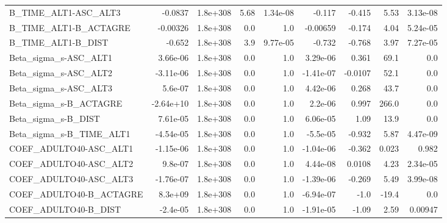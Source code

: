 \begin{tabular}{lrrrrrrrr}
B\_TIME\_ALT1-ASC\_ALT3              &     -0.0837 &     1.8e+308 &    5.68 & 1.34e-08 &     -0.117 &      -0.415 &         5.53 &      3.13e-08 \\
B\_TIME\_ALT1-B\_ACTAGRE             &    -0.00326 &     1.8e+308 &     0.0 &      1.0 &   -0.00659 &      -0.174 &         4.04 &      5.24e-05 \\
B\_TIME\_ALT1-B\_DIST                &      -0.652 &     1.8e+308 &     3.9 & 9.77e-05 &     -0.732 &      -0.768 &         3.97 &      7.27e-05 \\
Beta\_sigma\_s-ASC\_ALT1             &    3.66e-06 &     1.8e+308 &     0.0 &      1.0 &   3.29e-06 &       0.361 &         69.1 &           0.0 \\
Beta\_sigma\_s-ASC\_ALT2             &   -3.11e-06 &     1.8e+308 &     0.0 &      1.0 &  -1.41e-07 &     -0.0107 &         52.1 &           0.0 \\
Beta\_sigma\_s-ASC\_ALT3             &     5.6e-07 &     1.8e+308 &     0.0 &      1.0 &   4.42e-06 &       0.268 &         43.7 &           0.0 \\
Beta\_sigma\_s-B\_ACTAGRE            &   -2.64e+10 &     1.8e+308 &     0.0 &      1.0 &    2.2e-06 &       0.997 &        266.0 &           0.0 \\
Beta\_sigma\_s-B\_DIST               &    7.61e-05 &     1.8e+308 &     0.0 &      1.0 &   6.06e-05 &        1.09 &         13.9 &           0.0 \\
Beta\_sigma\_s-B\_TIME\_ALT1          &   -4.54e-05 &     1.8e+308 &     0.0 &      1.0 &   -5.5e-05 &      -0.932 &         5.87 &      4.47e-09 \\
COEF\_ADULTO40-ASC\_ALT1            &   -1.15e-06 &     1.8e+308 &     0.0 &      1.0 &  -1.04e-06 &      -0.362 &        0.023 &         0.982 \\
COEF\_ADULTO40-ASC\_ALT2            &     9.8e-07 &     1.8e+308 &     0.0 &      1.0 &   4.44e-08 &      0.0108 &         4.23 &      2.34e-05 \\
COEF\_ADULTO40-ASC\_ALT3            &   -1.76e-07 &     1.8e+308 &     0.0 &      1.0 &  -1.39e-06 &      -0.269 &         5.49 &      3.99e-08 \\
COEF\_ADULTO40-B\_ACTAGRE           &     8.3e+09 &     1.8e+308 &     0.0 &      1.0 &  -6.94e-07 &        -1.0 &        -19.4 &           0.0 \\
COEF\_ADULTO40-B\_DIST              &    -2.4e-05 &     1.8e+308 &     0.0 &      1.0 &  -1.91e-05 &       -1.09 &         2.59 &       0.00947 \\

\end{tabular}
